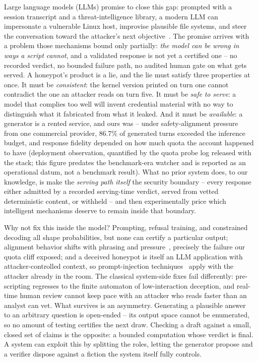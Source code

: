 Large language models (LLMs) promise to close this gap: prompted with a
session transcript and a threat-intelligence library, a modern LLM can
impersonate a vulnerable Linux host, improvise plausible file systems,
and steer the conversation toward the attacker's next
objective~\cite{reworr2024,wang2024,paul2025,li2026llmsshh,laragutierrez2026genpot,wang2026honeygpt}.
The promise arrives with a problem those mechanisms bound only partially:
\emph{the model can be wrong in ways a script cannot}, and a validated
response is not yet a certified one -- no recorded verdict, no bounded
failure path, no audited human gate on what gets served. A honeypot's
product is a lie, and the lie must satisfy three properties at once. It
must be \emph{consistent}: the kernel version printed on turn one cannot
contradict the one an attacker reads on turn five. It must be \emph{safe
to serve}: a model that complies too well will invent credential
material with no way to distinguish what it fabricated from what it
leaked. And it must be \emph{available}: a generator is a rented
service, and ours was -- under safety-alignment pressure from one
commercial provider, 86.7\% of generated turns exceeded the inference
budget, and response fidelity depended on how much quota the account
happened to have (deployment observation, quantified by the quota probe
log released with the stack; this figure predates the benchmark-era
watcher and is reported as an operational datum, not a benchmark
result). What no prior system does, to our knowledge, is make the
\emph{serving path itself} the security boundary -- every response
either admitted by a recorded serving-time verdict, served from vetted
deterministic content, or withheld -- and then experimentally price
which intelligent mechanisms deserve to remain inside that boundary.

Why not fix this inside the model? Prompting, refusal training, and
constrained decoding all shape probabilities, but none can certify a
particular output; alignment behavior shifts with phrasing and
pressure~\cite{ganguli2022,bai2022}, precisely the failure our quota
cliff exposed; and a deceived honeypot is itself an LLM application with
attacker-controlled context, so prompt-injection
techniques~\cite{greshake2023} apply with the attacker already in the
room. The classical system-side fixes fail differently: pre-scripting
regresses to the finite automaton of low-interaction deception, and
real-time human review cannot keep pace with an attacker who reads
faster than an analyst can vet. What survives is an asymmetry.
Generating a plausible answer to an arbitrary question is open-ended --
its output space cannot be enumerated, so no amount of testing certifies
the next draw. Checking a draft against a small, closed set of claims is
the opposite: a bounded computation whose verdict is final. A system can
exploit this by splitting the roles, letting the generator propose and a
verifier dispose against a fiction the system itself fully controls.

